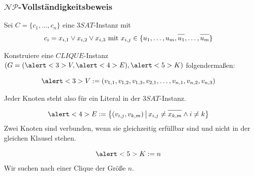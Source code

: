 \begin{frame}
\frametitle{$\mathcal{NP}$-Vollständigkeitsbeweis}
Sei $C = \{c_1, \ldots, c_n\}$ eine $3SAT$-Instanz mit 
$$ c_i = x_{i,1} \vee x_{i,2} \vee x_{i,3} \mbox{ mit } x_{i,j} \in \{u_1,\ldots,u_m,\neglit{u_1},\ldots,\neglit{u_m}\} $$

\pause

Konstruiere eine $CLIQUE$-Instanz $(G = (\alert<3>{V}, \alert<4>{E}), \alert<5>{K})$ folgendermaßen:

\pause

$$\alert<3>{V} := (v_{1,1}, v_{1,2}, v_{1,3}, v_{2,1},\ldots,v_{n,1},v_{n,2},v_{n,3})$$

Jeder Knoten steht also für ein Literal in der $3SAT$-Instanz. 

\pause

$$\alert<4>{E} := \menge{(v_{i,j},v_{k,m})}{x_{i,j} \neq \neglit{x_{k,m}} \wedge i \neq k}$$%
Zwei Knoten sind verbunden, wenn sie gleichzeitig erfüllbar sind und nicht in der gleichen Klausel stehen. 

\pause 
$$\alert<5>{K} := n$$
Wir suchen nach einer Clique der Größe $n$.\\

\end{frame}

